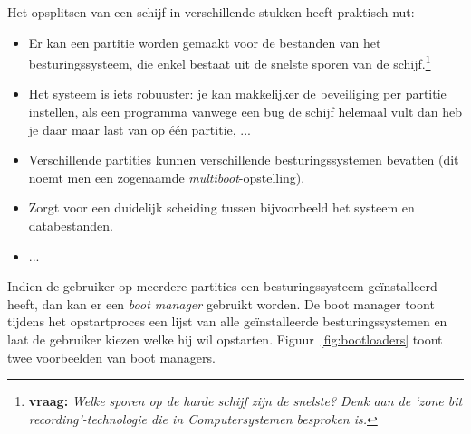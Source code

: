 Het opsplitsen van een schijf in verschillende stukken heeft praktisch nut:
\begin{itemize}
\item Er kan een partitie worden gemaakt voor de bestanden van het besturingssysteem, die enkel bestaat uit de snelste sporen van de schijf.\footnote{\textbf{vraag:} \emph{Welke sporen op de harde schijf zijn de snelste? Denk aan de `zone bit recording'-technologie die in Computersystemen besproken is.}}
\item Het systeem is iets robuuster: je kan makkelijker de beveiliging per partitie instellen, als een programma vanwege een bug de schijf helemaal vult dan heb je daar maar last van op \'e\'en partitie, ...
\item Verschillende partities kunnen verschillende besturingssystemen bevatten (dit noemt men een zogenaamde \emph{multiboot}-opstelling).
\item Zorgt voor een duidelijk scheiding tussen bijvoorbeeld het systeem en databestanden.
\item ...
\end{itemize}

Indien de gebruiker op meerdere partities een besturingssysteem ge\"installeerd heeft, dan kan er een
\emph{boot manager} gebruikt worden. De boot manager toont tijdens het opstartproces een lijst van alle
ge\"installeerde besturingssystemen en laat de gebruiker kiezen welke hij wil opstarten. Figuur~\ref{fig:bootloaders}
toont twee voorbeelden van boot managers.

